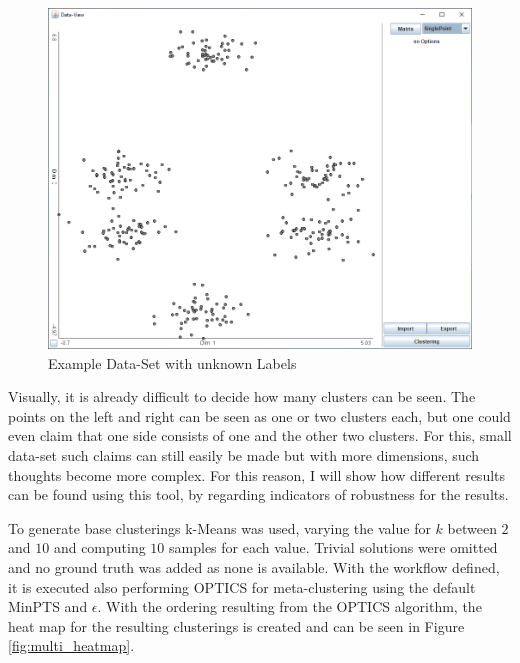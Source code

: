 \documentclass[
	a4paper,
	english,
	twoside,
	openright,               
	11pt                            
	]{report}
\begin{document}
\begin{figure}[h]
	\centering
	\includegraphics[scale=.4]{multi}
	\caption{Example Data-Set with unknown Labels}
	\label{fig:multi}
\end{figure}

Visually, it is already difficult to decide how many clusters can be seen. The points on the left and right can be seen as one or two clusters each, but one could even claim that one side consists of one and the other two clusters. For this, small data-set such claims can still easily be made but with more dimensions, such thoughts become more complex. For this reason, I will show how different results can be found using this tool, by regarding indicators of robustness for the results.

To generate base clusterings k-Means was used, varying the value for $k$ between $2$ and $10$ and computing $10$ samples for each value. Trivial solutions were omitted and no ground truth was added as none is available. With the workflow defined, it is executed also performing OPTICS for meta-clustering using the default MinPTS and $\epsilon$. With the ordering resulting from the OPTICS algorithm, the heat map for the resulting clusterings is created and can be seen in Figure \ref{fig:multi_heatmap}.
\end{document}
